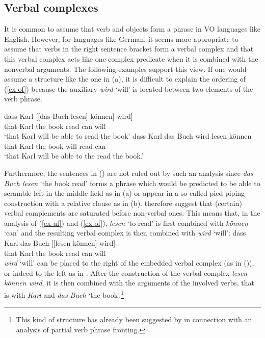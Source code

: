 \subsection{Verbal complexes}
\label{sec-vc-phen}

It is common to assume that verb and objects form a phrase in VO languages like English. However,
for languages like German, it seems more appropriate to assume that verbs in the right sentence
bracket form a verbal complex and that this verbal complex acts like one complex predicate when it
is combined with the nonverbal arguments. The following examples support this view. If one would
assume a structure like the one in (a), it is difficult to explain the ordering of
(\ref{ex-of}) because the auxiliary \emph{wird} `will' is located between two elements
of the verb phrase.

\eal
\ex
\label{ex-uf}
\gll dass Karl [[das Buch lesen] können] wird]\\
     that Karl \hspaceThis{[[}the book read can will\\
\glt `that Karl will be able to read the book'
\ex
\label{ex-of}
\gll dass Karl das Buch wird lesen können\\
     that Karl the book will read can\\
\glt `that Karl will be able to the read the book.'
\zl

Furthermore, the sentences in () are not ruled out by such an analysis since \emph{das Buch
  lesen} `the book read' forms a phrase which would be predicted to be able to scramble left in the
middle-field as in (a) or appear in a so-called pied-piping construction with a relative
clause as in (b).
\eal
{}
\zl
%
\citet*{HN94a} therefore suggest that (certain) verbal complements are
saturated before non-verbal ones. This means that, in the analysis of (\ref{ex-uf}) and
(\ref{ex-of}), \emph{lesen} `to read' is first combined with \emph{können} `can' and the resulting
verbal complex is then combined with \emph{wird} `will':
\ea
\gll dass Karl das Buch [[lesen können] wird]\\
     that Karl the book \hspaceThis{[[}read can will\\
\z
\emph{wird} `will' can be placed to the right of the embedded verbal complex (as in ()), or indeed to the left as
in . After the construction of the verbal complex \emph{lesen können wird}, it is then combined with the 
arguments of the involved verbs, that is with \emph{Karl} and \emph{das Buch} `the book'.\footnote{%
  This kind of structure has already been suggested by \citet*{Johnson86a} in connection with an
  analysis of partial verb phrase fronting.
}

